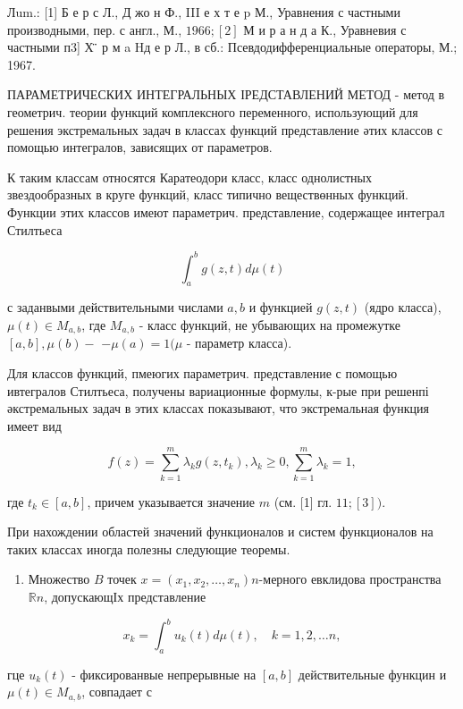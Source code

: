 \documentclass[10pt]{article}
\begin{document}
Лum.: [1] Б е р с Л., Д жо н Ф., III е х т е p М., Уравнения с частными производными, пер. с англ., М., $1966 ;[2]$ М и р а н д а К., Уравневия с частными п3] Х ̈̈ р м a Hд е р Л., в сб.: Псевдодифференциальные операторы, М.; 1967.



ПАРАМЕТРИЧЕСКИХ ИНТЕГРАЛЬНЫХ ІРЕДСТАВЛЕНИЙ МЕТОД - метод в геометрич. теории функций комплексного переменного, использующий для решения экстремальных задач в классах функций представление әтих классов с помощью интегралов, зависящих от параметров.



К таким классам относятся Каратеодори класс, класс однолистных звездообразных в круге функций, класс типично веществөнных функций. Функции этих классов имеют параметрич. представление, содержащее интеграл Стилтьеса



\[

\int_{a}^{b} g(z, t) d \mu(t)

\]



с заданвыми действительными числами $a, b$ и функцией $g(z, t)$ (ядро класса), $\mu(t) \in M_{a, b}$, где $M_{a, b}$ - класс функций, не убывающих на промежутке $[a, b], \mu(b)-$ $-\mu(a)=1(\mu$ - параметр класса).



Для классов функций, пмеюгих параметрич. представление с помощью ивтегралов Стилтьеса, получены вариационные формулы, к-рые при решенпі әкстремальных задач в этих классах показывают, что экстремальная функция имеет вид



\[

f(z)=\sum_{k=1}^{m} \lambda_{k} g\left(z, t_{k}\right), \lambda_{k} \geqslant 0, \sum_{k=1}^{m} \lambda_{k}=1,

\]



где $t_{k} \in[a, b]$, причем указывается значение $m$ (см. [1] гл. $11 ;[3])$.



При нахождении областей значений функционалов и систем функционалов на таких классах иногда полезны следующие теоремы.



\begin{enumerate}

  \item Множество $B$ точек $x=\left(x_{1}, x_{2}, \ldots, x_{n}\right) n$-мерного евклидова пространства $\mathbb{R} n$, допускающІх представление

\end{enumerate}



\[

x_{k}=\int_{a}^{b} u_{k}(t) d \mu(t), \quad k=1,2, \ldots n,

\]



гце $u_{k}(t)$ - фиксированвые непрерывные на $[a, b]$ действительные функцин и $\mu(t) \in M_{a, b}$, совпадает с
\end{document}

